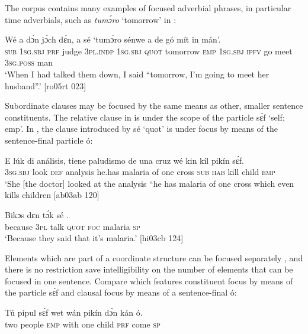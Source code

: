 The corpus contains many examples of focused adverbial phrases, in particular time adverbials, such as \textit{tumɔ́ro} ‘tomorrow’ in :


\ea%
    \label{ex:key:676}
    \gll Wé  a    dɔ́n  jɔ́ch    dɛ́n,    a    sé    ‘tumɔ́ro    sénwe
a    de  gó  mít    in    mán’.\\
\textsc{sub}  \textsc{1sg.sbj}  \textsc{prf}  judge  \textsc{3pl.indp}  \textsc{1sg.sbj}  \textsc{quot}    tomorrow  \textsc{emp}
\textsc{1sg.sbj}  \textsc{ipfv}  go  meet  \textsc{3sg.poss}  man\\

\glt ‘When I had talked them down, I said “tomorrow, I’m going to meet 
her husband”.’ [ro05rt 023]
\z

Subordinate clauses may be focused by the same means as other, smaller sentence constituents. The relative clause{\fff} in  is under the scope of the particle sɛ́f ‘self; emp’. In , the clause introduced by sé ‘quot’ is under focus by means of the sentence-final particle ó:


\ea%
    \label{ex:key:677}
\gll
E    lúk    di  análisis,  tiene  paludismo  de  una  cruz
wé  kin  kíl  pikín  sɛ́f.\\
\textsc{3sg.sbj}  look    \textsc{def}  analysis  he.has  malaria    of  one  cross
\textsc{sub}  \textsc{hab}  kill  child  \textsc{emp}\\

\glt ‘She [the doctor] looked at the analysis “he has malaria of one cross 
which even kills children [ab03ab 120]
\z


\ea%
    \label{ex:key:678}
    \gll Bikɔs  dɛn  tɔ́k  sé      .\\
because  \textsc{3pl}  talk  \textsc{quot}  \textsc{foc}  malaria    \textsc{sp}\\

\glt ‘Because they said that it’s malaria.’ [hi03cb 124]
\z

Elements which are part of a coordinate structure can be focused separately , and there is no restriction save intelligibility on the number of elements that can be focused in one sentence. Compare  which features constituent focus by means of the particle sɛ́f and clausal focus by means of a sentence-final ó:


\ea%
    \label{ex:key:679}
    \gll Tú  pípul  sɛ́f  wet  wán  pikín  dɔ́n  kán    ó.\\
two  people  \textsc{emp}  with  one  child  \textsc{prf}  come  \textsc{sp}\\

